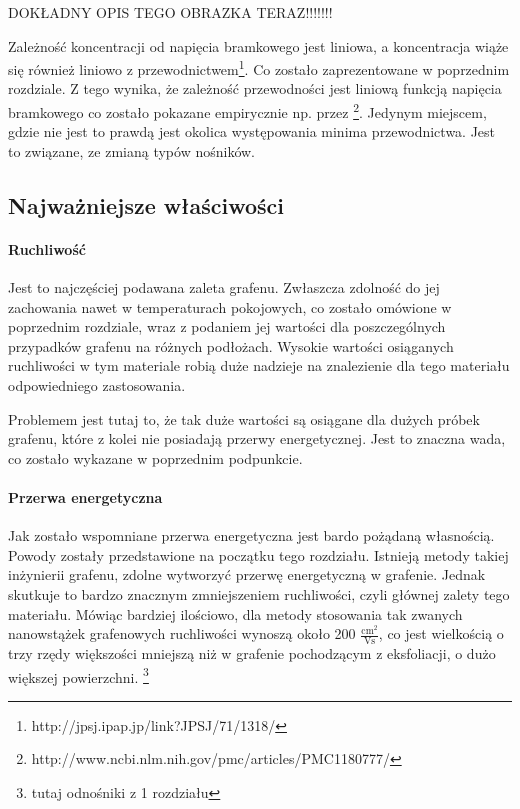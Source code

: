 DOKŁADNY OPIS TEGO OBRAZKA TERAZ!!!!!!!
	
	Zależność koncentracji od napięcia bramkowego jest liniowa, a koncentracja wiąże się również liniowo z 
	przewodnictwem\footnote{http://jpsj.ipap.jp/link?JPSJ/71/1318/}. Co zostało zaprezentowane w poprzednim rozdziale.
	 Z tego wynika, że zależność przewodności jest liniową funkcją napięcia bramkowego co zostało pokazane empirycznie
	np. przez \footnote{http://www.ncbi.nlm.nih.gov/pmc/articles/PMC1180777/}.
	Jedynym miejscem, gdzie nie jest to prawdą jest okolica występowania minima przewodnictwa. Jest to związane, ze 
	zmianą typów nośników. 

	
	



		\subsection{Najważniejsze właściwości}
			\paragraph{Ruchliwość}


	Jest to najczęściej podawana zaleta grafenu. Zwłaszcza zdolność do jej zachowania nawet w temperaturach 
	pokojowych, co zostało omówione w poprzednim rozdziale, wraz z podaniem jej wartości dla poszczególnych 
	przypadków grafenu na różnych podłożach.
	Wysokie wartości osiąganych ruchliwości w tym materiale robią duże nadzieje na znalezienie dla tego materiału
	odpowiedniego zastosowania. 
	
	Problemem jest tutaj to, że tak duże wartości są osiągane dla dużych próbek grafenu, które z kolei nie posiadają 
	przerwy energetycznej. Jest to znaczna wada, co zostało wykazane w poprzednim podpunkcie. 
			\paragraph{Przerwa energetyczna}


	Jak zostało wspomniane przerwa energetyczna jest bardo pożądaną własnością. Powody zostały przedstawione na początku
	tego rozdziału. Istnieją metody takiej inżynierii grafenu, zdolne wytworzyć przerwę energetyczną w grafenie. 
	Jednak skutkuje to bardzo znacznym zmniejszeniem ruchliwości, czyli głównej zalety tego materiału.
	Mówiąc bardziej ilościowo, dla metody stosowania tak zwanych nanowstążek grafenowych ruchliwości wynoszą około 
	200 $\mathrm{\frac{cm^2}{V s}}$, co jest wielkością o trzy rzędy większości mniejszą niż w grafenie pochodzącym
	z eksfoliacji, o dużo większej powierzchni. \footnote{tutaj odnośniki z 1 rozdziału}

